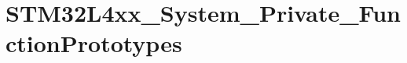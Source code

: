 \hypertarget{group___s_t_m32_l4xx___system___private___function_prototypes}{}\section{S\+T\+M32\+L4xx\+\_\+\+System\+\_\+\+Private\+\_\+\+Function\+Prototypes}
\label{group___s_t_m32_l4xx___system___private___function_prototypes}
